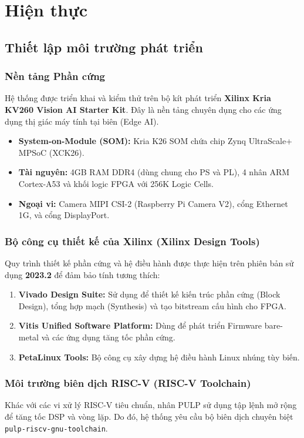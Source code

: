 \chapter{Hiện thực}

\section{Thiết lập môi trường phát triển}
\label{sec:dev_setup}

\subsection{Nền tảng Phần cứng}
Hệ thống được triển khai và kiểm thử trên bộ kít phát triển \textbf{Xilinx Kria KV260 Vision AI Starter Kit}. Đây là nền tảng chuyên dụng cho các ứng dụng thị giác máy tính tại biên (Edge AI).
\begin{itemize}
    \item \textbf{System-on-Module (SOM):} Kria K26 SOM chứa chip Zynq UltraScale+ MPSoC (XCK26).
    \item \textbf{Tài nguyên:} 4GB RAM DDR4 (dùng chung cho PS và PL), 4 nhân ARM Cortex-A53 và khối logic FPGA với 256K Logic Cells.
    \item \textbf{Ngoại vi:} Camera MIPI CSI-2 (Raspberry Pi Camera V2), cổng Ethernet 1G, và cổng DisplayPort.
\end{itemize}


\subsection{Bộ công cụ thiết kế của Xilinx (Xilinx Design Tools)}
Quy trình thiết kế phần cứng và hệ điều hành được thực hiện trên phiên bản 
sử dụng \textbf{2023.2} để đảm bảo tính tương thích:

\begin{enumerate}
    \item \textbf{Vivado Design Suite:} Sử dụng để thiết kế kiến trúc phần cứng 
    (Block Design), tổng hợp mạch (Synthesis) và tạo bitstream cấu hình cho FPGA.
    \item \textbf{Vitis Unified Software Platform:} Dùng để phát triển Firmware 
    bare-metal và các ứng dụng tăng tốc phần cứng.
    \item \textbf{PetaLinux Tools:} Bộ công cụ xây dựng hệ điều hành 
    Linux nhúng tùy biến.
\end{enumerate}

\subsection{Môi trường biên dịch RISC-V (RISC-V Toolchain)}
Khác với các vi xử lý RISC-V tiêu chuẩn, nhân PULP sử dụng tập 
lệnh mở rộng để tăng tốc DSP và vòng lặp. Do đó, hệ thống yêu cầu bộ biên dịch 
chuyên biệt \texttt{pulp-riscv-gnu-toolchain}.

